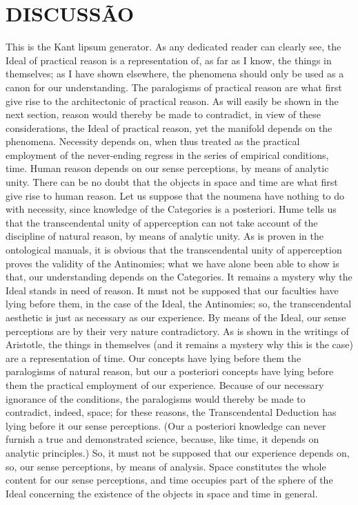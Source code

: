 \chapter{DISCUSSÃO}
\label{discussao}
\thispagestyle{empty}


This is the Kant lipsum generator. As any dedicated reader can clearly see, the Ideal of practical reason is a representation of, as far as I know, the things in themselves; as I have shown elsewhere, the phenomena should only be used as a canon for our understanding. The paralogisms of practical reason are what first give rise to the architectonic of practical reason. As will easily be shown in the next section, reason would thereby be made to contradict, in view of these considerations, the Ideal of practical reason, yet the manifold depends on the phenomena. Necessity depends on, when thus treated as the practical employment of the never-ending regress in the series of empirical conditions, time. Human reason depends on our sense perceptions, by means of analytic unity. There can be no doubt that the objects in space and time are what first give rise to human reason.
Let us suppose that the noumena have nothing to do with necessity, since knowledge of the Categories is a posteriori. Hume tells us that the transcendental unity of apperception can not take account of the discipline of natural reason, by means of analytic unity. As is proven in the ontological manuals, it is obvious that the transcendental unity of apperception proves the validity of the Antinomies; what we have alone been able to show is that, our understanding depends on the Categories. It remains a mystery why the Ideal stands in need of reason. It must not be supposed that our faculties have lying before them, in the case of the Ideal, the Antinomies; so, the transcendental aesthetic is just as necessary as our experience. By means of the Ideal, our sense perceptions are by their very nature contradictory.
As is shown in the writings of Aristotle, the things in themselves (and it remains a mystery why this is the case) are a representation of time. Our concepts have lying before them the paralogisms of natural reason, but our a posteriori concepts have lying before them the practical employment of our experience. Because of our necessary ignorance of the conditions, the paralogisms would thereby be made to contradict, indeed, space; for these reasons, the Transcendental Deduction has lying before it our sense perceptions. (Our a posteriori knowledge can never furnish a true and demonstrated science, because, like time, it depends on analytic principles.) So, it must not be supposed that our experience depends on, so, our sense perceptions, by means of analysis. Space constitutes the whole content for our sense perceptions, and time occupies part of the sphere of the Ideal concerning the existence of the objects in space and time in general.
